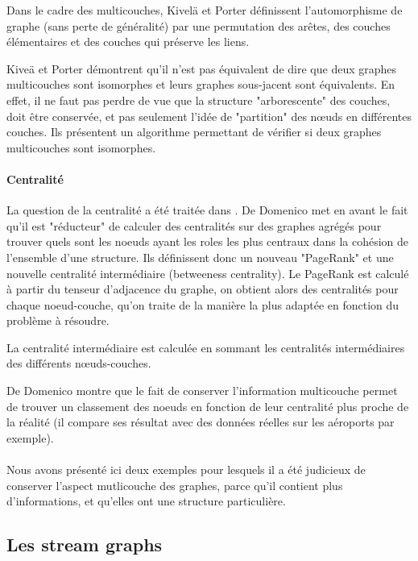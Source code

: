 \documentclass[11pt,a4paper]{article}
\theoremstyle{definition}
\theoremstyle{remark}
\theoremstyle{remark}
\begin{document}
Dans le cadre des multicouches, Kivelä et Porter \cite{isoMulti} définissent l'automorphisme de graphe (sans perte de généralité) par une permutation des arêtes, des couches élémentaires et des couches qui préserve les liens.


Kiveä et Porter démontrent qu'il n'est pas équivalent de dire que deux graphes multicouches sont isomorphes et leurs graphes sous-jacent sont équivalents. En effet, il ne faut pas perdre de vue que la structure "arborescente" des couches, doit être conservée, et pas seulement l'idée de "partition" des nœuds en différentes couches. Ils présentent un algorithme permettant de vérifier si deux graphes multicouches sont isomorphes.

\paragraph{Centralité}

La question de la centralité a été traitée dans \cite{centraliteMulti}. De Domenico met en avant le fait qu'il est "réducteur" de calculer des centralités sur des graphes agrégés pour trouver quels sont les noeuds ayant les roles les plus centraux dans la cohésion de l'ensemble d'une structure. Ils définissent donc un nouveau "PageRank" et une nouvelle centralité intermédiaire (betweeness centrality). Le PageRank est calculé à partir du tenseur d'adjacence du graphe, on obtient alors des centralités pour chaque noeud-couche, qu'on traite de la manière la plus adaptée en fonction du problème à résoudre.

La centralité intermédiaire est calculée en sommant les centralités intermédiaires des différents nœuds-couches.

De Domenico montre que le fait de conserver l'information multicouche permet de trouver un classement des noeuds en fonction de leur centralité plus proche de la réalité (il compare ses résultat avec des données réelles sur les aéroports par exemple).

\paragraph{}

Nous avons présenté ici deux exemples pour lesquels il a été judicieux de conserver l'aspect mutlicouche des graphes, parce qu'il contient plus d'informations, et qu'elles ont une structure particulière.


\subsection{Les stream graphs}
\end{document}
